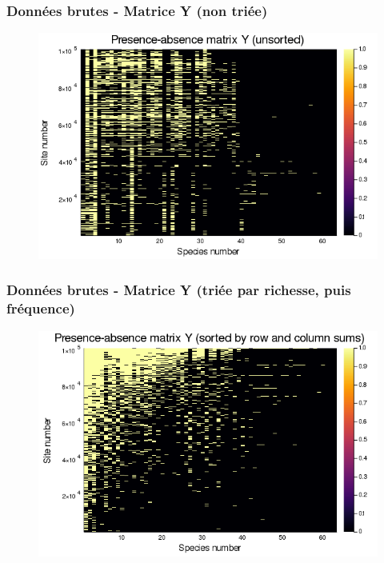 \documentclass[10pt]{beamer}
\begin{document}
\begin{frame}
  \frametitle{Données brutes - Matrice Y (non triée)}
  \begin{figure}
    \centering
    \includegraphics[scale=0.4]{fig/raw-Y-unsorted.png}
  \end{figure}
\end{frame}

\begin{frame}
  \frametitle{Données brutes - Matrice Y (triée par richesse, puis fréquence)}
  \begin{figure}
    \centering
    \includegraphics[scale=0.4]{fig/raw-Y-rowcolsorted.png}
  \end{figure}
\end{frame}
\end{document}
